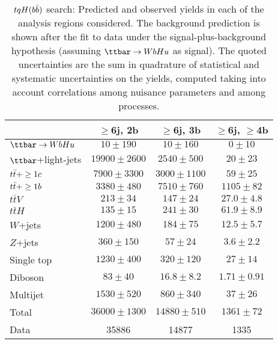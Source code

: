 \begin{table}[htbp]
\begin{center}
\begin{tabular}{l*{3}{c}}
\hline\hline
 & $\geq$6j, 2b & $\geq$6j, 3b & $\geq$6j, $\geq$4b \\
\hline
$\Hu$  &   $ 10 \pm 190 $ &   $ 10 \pm 160 $ &   $ 0 \pm 10 $ \\ 
\hline
$\ttbar$+light-jets  &   $ 19900 \pm 2600 $ &   $ 2540 \pm 500 $ &   $ 20 \pm 23 $ \\ 
$t\bar{t}+\geq1c$  &   $ 7900 \pm 3300 $ &   $ 3000 \pm 1100 $ &   $ 59 \pm 25 $ \\ 
$t\bar{t}+\geq1b$  &   $ 3380 \pm 480 $ &   $ 7510 \pm 760 $ &   $ 1105 \pm 82 $ \\ 
$t\bar{t}V$  &   $ 213 \pm 34 $ &   $ 147 \pm 24 $ &   $ 27.0 \pm 4.8 $ \\ 
$t\bar{t}H$  &   $ 135 \pm 15 $ &   $ 241 \pm 30 $ &   $ 61.9 \pm 8.9 $ \\ 
$W$+jets  &   $ 1200 \pm 480 $ &   $ 184 \pm 75 $ &   $ 12.5 \pm 5.7 $ \\ 
$Z$+jets  &   $ 360 \pm 150 $ &   $ 57 \pm 24 $ &   $ 3.6 \pm 2.2 $ \\ 
Single top  &   $ 1230 \pm 400 $ &   $ 320 \pm 120 $ &   $ 27 \pm 14 $ \\ 
Diboson  &   $ 83 \pm 40 $ &   $ 16.8 \pm 8.2 $ &   $ 1.71 \pm 0.91 $ \\ 
Multijet  &   $ 1530 \pm 520 $ &   $ 860 \pm 340 $ &   $ 37 \pm 26 $ \\ 
\hline
Total & $ 36000 \pm 1300 $ &   $ 14880 \pm 510 $ &   $ 1361 \pm 72 $ \\ 
\hline
Data & 35886  & 14877  & 1335  \\
\hline\hline      
\end{tabular}

%
\end{center}
\caption{
$tqH(b\bar{b})$ search: Predicted and observed yields in each of the analysis regions considered.
The background prediction is shown after the fit to data under the signal-plus-background hypothesis (assuming $\Hu$ as signal).
The quoted uncertainties are the sum in quadrature of statistical and systematic uncertainties on the yields, 
computed taking into account correlations among nuisance parameters and among processes.
}
\label{tab:Hbb_Postfit_Yields_Unblind_Hu}
\end{table}
